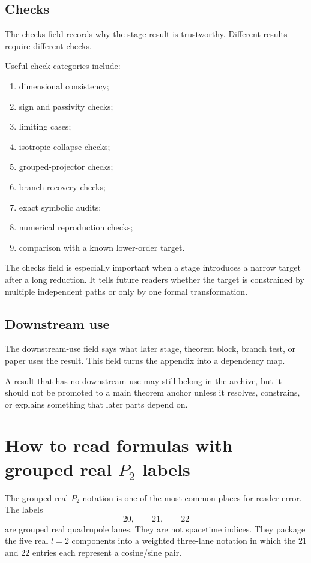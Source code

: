 \subsection{Checks}
\label{subsec:stage-checks}

The checks field records why the stage result is trustworthy.  Different results require different checks.

Useful check categories include:
\begin{enumerate}[leftmargin=2.2em]
  \item dimensional consistency;
  \item sign and passivity checks;
  \item limiting cases;
  \item isotropic-collapse checks;
  \item grouped-projector checks;
  \item branch-recovery checks;
  \item exact symbolic audits;
  \item numerical reproduction checks;
  \item comparison with a known lower-order target.
\end{enumerate}

The checks field is especially important when a stage introduces a narrow target after a long reduction.  It tells future readers whether the target is constrained by multiple independent paths or only by one formal transformation.

\subsection{Downstream use}
\label{subsec:stage-downstream-use}

The downstream-use field says what later stage, theorem block, branch test, or paper uses the result.  This field turns the appendix into a dependency map.

A result that has no downstream use may still belong in the archive, but it should not be promoted to a main theorem anchor unless it resolves, constrains, or explains something that later parts depend on.

\section{How to read formulas with grouped real \texorpdfstring{\(P_2\)}{P2} labels}
\label{sec:how-to-read-grouped-p2}

The grouped real \(P_2\) notation is one of the most common places for reader error.  The labels
\[
20,
\qquad
21,
\qquad
22
\]
are grouped real quadrupole lanes.  They are not spacetime indices.  They package the five real \(l=2\) components into a weighted three-lane notation in which the \(21\) and \(22\) entries each represent a cosine/sine pair.

